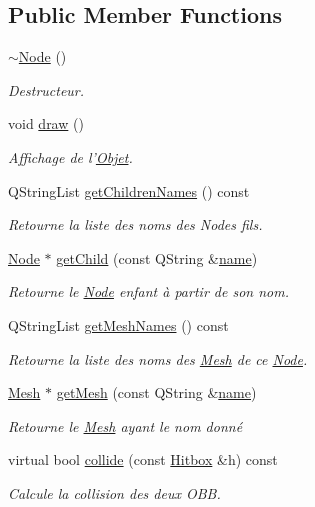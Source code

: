 \subsection*{Public Member Functions}
\begin{DoxyCompactItemize}
\item 
\hyperlink{class_node_aa0840c3cb5c7159be6d992adecd2097c}{$\sim$\+Node} ()
\begin{DoxyCompactList}\small\item\em Destructeur. \end{DoxyCompactList}\item 
void \hyperlink{class_node_ab88c83ced58700a56de568f5b1e3c473}{draw} ()
\begin{DoxyCompactList}\small\item\em Affichage de l'\hyperlink{class_objet}{Objet}. \end{DoxyCompactList}\item 
Q\+String\+List \hyperlink{class_node_af7d6e2eab0af346f6690b4a2db12d953}{get\+Children\+Names} () const 
\begin{DoxyCompactList}\small\item\em Retourne la liste des noms des Nodes fils. \end{DoxyCompactList}\item 
\hyperlink{class_node}{Node} $\ast$ \hyperlink{class_node_afdc8a8f6c370f437037c85ffea5af4c1}{get\+Child} (const Q\+String \&\hyperlink{class_objet_a4a702c189bedcbf1e65da6aec72c8e44}{name})
\begin{DoxyCompactList}\small\item\em Retourne le \hyperlink{class_node}{Node} enfant à partir de son nom. \end{DoxyCompactList}\item 
Q\+String\+List \hyperlink{class_node_a4a3bbcabcbd5423c297e287dd0ab7ecd}{get\+Mesh\+Names} () const 
\begin{DoxyCompactList}\small\item\em Retourne la liste des noms des \hyperlink{class_mesh}{Mesh} de ce \hyperlink{class_node}{Node}. \end{DoxyCompactList}\item 
\hyperlink{class_mesh}{Mesh} $\ast$ \hyperlink{class_node_a47c225bb649c6d44763661f6e3253c7c}{get\+Mesh} (const Q\+String \&\hyperlink{class_objet_a4a702c189bedcbf1e65da6aec72c8e44}{name})
\begin{DoxyCompactList}\small\item\em Retourne le \hyperlink{class_mesh}{Mesh} ayant le nom donné \end{DoxyCompactList}\item 
virtual bool \hyperlink{class_node_a07ceab8d57814d67b0a6a3c662130aa2}{collide} (const \hyperlink{class_hitbox}{Hitbox} \&h) const 
\begin{DoxyCompactList}\small\item\em Calcule la collision des deux O\+B\+B. \end{DoxyCompactList}\end{DoxyCompactItemize}
